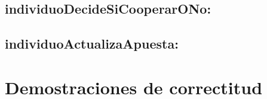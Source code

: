 \documentclass[10pt,a4paper]{article}
\begin{document}
\subsection{individuoDecideSiCooperarONo:}

\subsection{individuoActualizaApuesta:}

\section{Demostraciones de correctitud}
\end{document}
